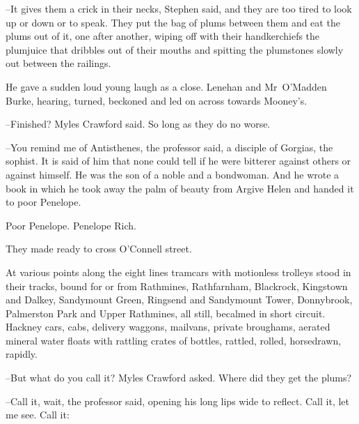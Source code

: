 --It gives them a crick in their necks,
Stephen said,
and they are too tired to look up or down or to speak.
They put the bag of plums between them and eat the plums out of it,
one after another,
wiping off with their handkerchiefs the plumjuice
that dribbles out of their mouths
and spitting the plumstones slowly out between the railings.

He gave a sudden loud young laugh as a close.
Lenehan and Mr~O'Madden Burke,
hearing,
turned,
beckoned
and led on across towards Mooney's.

--Finished?
Myles Crawford said.
So long as they do no worse.



--You remind me of Antisthenes,
the professor said,
a disciple of Gorgias, the sophist.
It is said of him that none could tell
if he were bitterer against others or against himself.
He was the son of a noble and a bondwoman.
And he wrote a book
in which he took away the palm of beauty from Argive Helen
and handed it to poor Penelope.

Poor Penelope.
Penelope Rich.

They made ready to cross O'Connell street.



At various points along the eight lines
tramcars with motionless trolleys stood in their tracks,
bound for or from
Rathmines,
Rathfarnham,
Blackrock,
Kingstown and Dalkey,
Sandymount Green,
Ringsend and
Sandymount Tower,
Donnybrook,
Palmerston Park and Upper Rathmines,
all still,
becalmed in short circuit.
Hackney cars,
cabs,
delivery
waggons,
mailvans,
private broughams,
aerated mineral water floats with rattling crates of bottles,
rattled,
rolled,
horsedrawn,
rapidly.




--But what do you call it?
Myles Crawford asked.
Where did they get the plums?



--Call it, wait,
the professor said,
opening his long lips wide to
reflect.
Call it,
let me see.
Call it:

